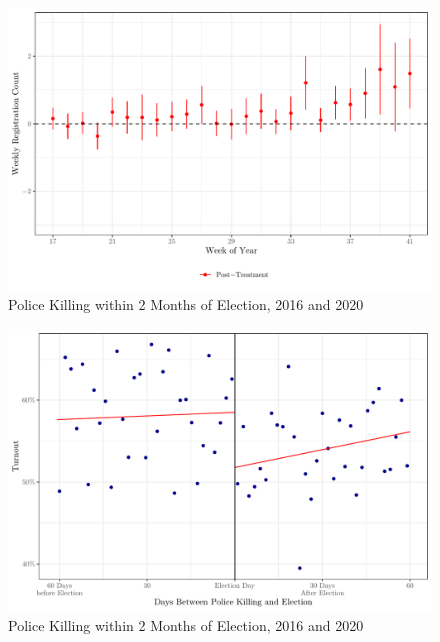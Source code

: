 \documentclass[
  12pt,
]{article}
\begin{document}
\begin{figure}[h]

{\centering \includegraphics{shoot_to_files/figure-latex/did-week-1} 

}

\caption{\label{fig:map}Police Killing within 2 Months of Election, 2016 and 2020}\label{fig:did-week}
\end{figure}

\begin{figure}[h]

{\centering \includegraphics{shoot_to_files/figure-latex/rd-plot-1} 

}

\caption{\label{fig:map}Police Killing within 2 Months of Election, 2016 and 2020}\label{fig:rd-plot}
\end{figure}
\end{document}
